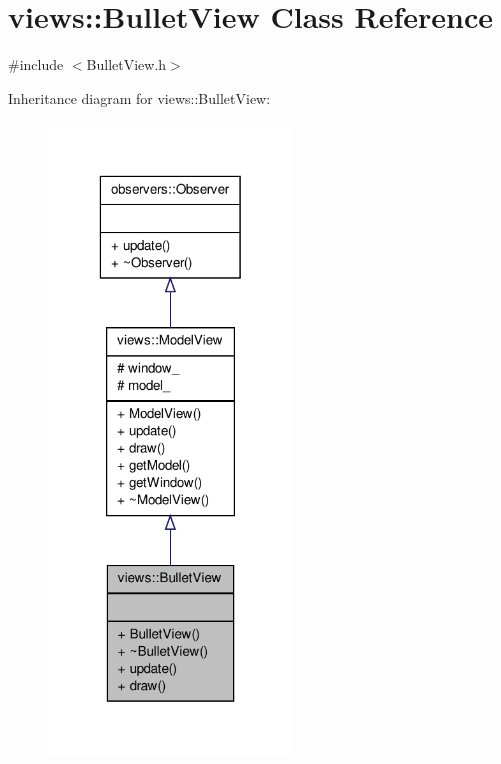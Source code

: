 \hypertarget{classviews_1_1BulletView}{\section{views\-:\-:\-Bullet\-View \-Class \-Reference}
\label{d8/df6/classviews_1_1BulletView}
}


{\ttfamily \#include $<$\-Bullet\-View.\-h$>$}



\-Inheritance diagram for views\-:\-:\-Bullet\-View\-:\nopagebreak
\begin{figure}[H]
\begin{center}
\leavevmode
\includegraphics[width=184pt]{dc/dfb/classviews_1_1BulletView__inherit__graph}
\end{center}
\end{figure}


